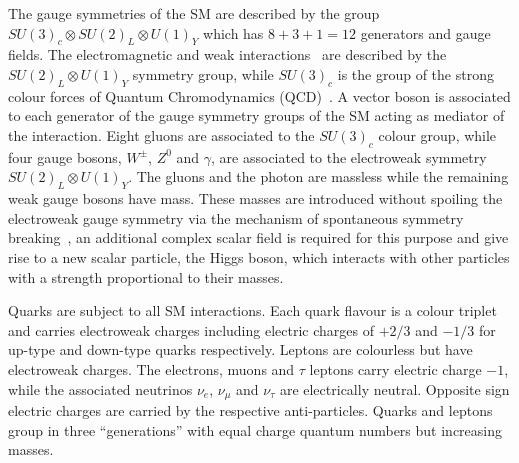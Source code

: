 
The gauge  symmetries of the SM are described by the group $SU(3)_c \otimes SU(2)_L \otimes U(1)_Y$ which has $8+3+1=12$
generators and gauge fields. The electromagnetic and weak interactions~\cite{EW1,EW2,EW3}  are described  by the 
$SU(2)_L \otimes U(1)_Y$ symmetry group, while $ SU(3)_c$ is the group of the strong colour forces of Quantum Chromodynamics (QCD)~\cite{qcd1}.
A vector boson is associated to each generator of the gauge symmetry groups of the SM acting as  mediator of the interaction.
Eight gluons are associated to the $ SU(3)_c$ colour group, while  four gauge bosons, $W^{\pm}$,
$Z^0$ and $\gamma$, are associated to the electroweak symmetry $SU(2)_L \otimes U(1)_Y$. 
The gluons and the photon are massless while the remaining weak gauge bosons have mass. 
These masses are introduced without spoiling the electroweak gauge symmetry 
via the mechanism of spontaneous symmetry breaking~\cite{ENGLERT,HIGGS,HIGGS2,HIGGS3,kibble}, an additional complex scalar field is required for this
purpose and give rise to a new scalar particle, the Higgs boson, which interacts with other particles with a strength proportional to their masses.

Quarks  are subject to all SM interactions. Each quark flavour  is a colour triplet and carries 
electroweak charges including electric charges of $+2/3$ and $-1/3$ for up-type and  down-type quarks respectively.
Leptons are colourless but have electroweak charges. The electrons, muons and $\tau$ leptons carry  electric charge  $-1$,
while the associated neutrinos $\nu_e$, $\nu_{\mu}$ and $\nu_{\tau}$ are electrically neutral. Opposite sign 
electric charges are carried by the respective anti-particles.
Quarks and leptons group in three  ``generations'' with equal charge quantum numbers but increasing masses.

